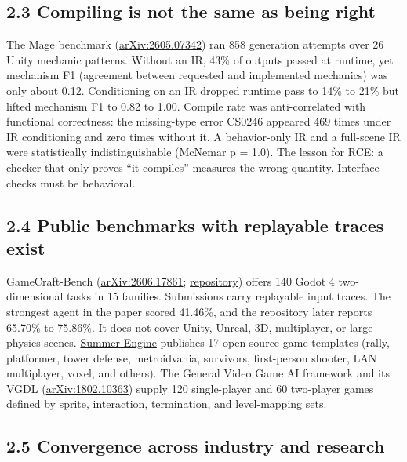 \documentclass[10pt,letterpaper]{article}
\begin{document}
\subsection{2.3 Compiling is not the same as being
right}\label{compiling-is-not-the-same-as-being-right}

The Mage benchmark
(\href{https://arxiv.org/abs/2605.07342}{arXiv:2605.07342}) ran 858
generation attempts over 26 Unity mechanic patterns. Without an IR, 43\%
of outputs passed at runtime, yet mechanism F1 (agreement between
requested and implemented mechanics) was only about 0.12. Conditioning
on an IR dropped runtime pass to 14\% to 21\% but lifted mechanism F1 to
0.82 to 1.00. Compile rate was anti-correlated with functional
correctness: the missing-type error CS0246 appeared 469 times under IR
conditioning and zero times without it. A behavior-only IR and a
full-scene IR were statistically indistinguishable (McNemar p = 1.0).
The lesson for RCE: a checker that only proves ``it compiles'' measures
the wrong quantity. Interface checks must be behavioral.

\subsection{2.4 Public benchmarks with replayable traces
exist}\label{public-benchmarks-with-replayable-traces-exist}

GameCraft-Bench
(\href{https://arxiv.org/abs/2606.17861}{arXiv:2606.17861};
\href{https://github.com/FreedomIntelligence/gamecraft-bench}{repository})
offers 140 Godot 4 two-dimensional tasks in 15 families. Submissions
carry replayable input traces. The strongest agent in the paper scored
41.46\%, and the repository later reports 65.70\% to 75.86\%. It does
not cover Unity, Unreal, 3D, multiplayer, or large physics scenes.
\href{https://www.summerengine.com/templates}{Summer Engine} publishes
17 open-source game templates (rally, platformer, tower defense,
metroidvania, survivors, first-person shooter, LAN multiplayer, voxel,
and others). The General Video Game AI framework and its VGDL
(\href{https://arxiv.org/abs/1802.10363}{arXiv:1802.10363}) supply 120
single-player and 60 two-player games defined by sprite, interaction,
termination, and level-mapping sets.

\subsection{2.5 Convergence across industry and
research}\label{convergence-across-industry-and-research}
\end{document}
